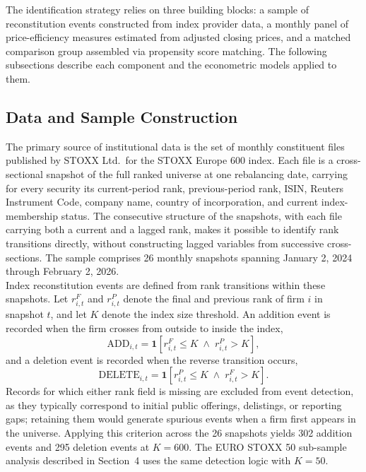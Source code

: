 \documentclass[12pt, a4paper]{article}
\begin{document}
The identification strategy relies on three building blocks: a sample of reconstitution events constructed from index provider data, a monthly panel of price-efficiency measures estimated from adjusted closing prices, and a matched comparison group assembled via propensity score matching. The following subsections describe each component and the econometric models applied to them.\\

\subsection{Data and Sample Construction}
\label{sec:data}

The primary source of institutional data is the set of monthly constituent files published by STOXX Ltd.\ for the STOXX Europe 600 index. Each file is a cross-sectional snapshot of the full ranked universe at one rebalancing date, carrying for every security its current-period rank, previous-period rank, ISIN, Reuters Instrument Code, company name, country of incorporation, and current index-membership status. The consecutive structure of the snapshots, with each file carrying both a current and a lagged rank, makes it possible to identify rank transitions directly, without constructing lagged variables from successive cross-sections. The sample comprises 26 monthly snapshots spanning January 2, 2024 through February 2, 2026.\\

Index reconstitution events are defined from rank transitions within these snapshots. Let $r^F_{i,t}$ and $r^P_{i,t}$ denote the final and previous rank of firm $i$ in snapshot $t$, and let $K$ denote the index size threshold. An addition event is recorded when the firm crosses from outside to inside the index,
\begin{equation}
    \text{ADD}_{i,t} = \mathbf{1}\!\left[ r^F_{i,t} \leq K \;\wedge\; r^P_{i,t} > K \right], \label{eq:add}
\end{equation}
and a deletion event is recorded when the reverse transition occurs,
\begin{equation}
    \text{DELETE}_{i,t} = \mathbf{1}\!\left[ r^P_{i,t} \leq K \;\wedge\; r^F_{i,t} > K \right]. \label{eq:delete}
\end{equation}
Records for which either rank field is missing are excluded from event detection, as they typically correspond to initial public offerings, delistings, or reporting gaps; retaining them would generate spurious events when a firm first appears in the universe. Applying this criterion across the 26 snapshots yields 302 addition events and 295 deletion events at $K = 600$. The EURO STOXX 50 sub-sample analysis described in Section~4 uses the same detection logic with $K = 50$.\\
\end{document}
